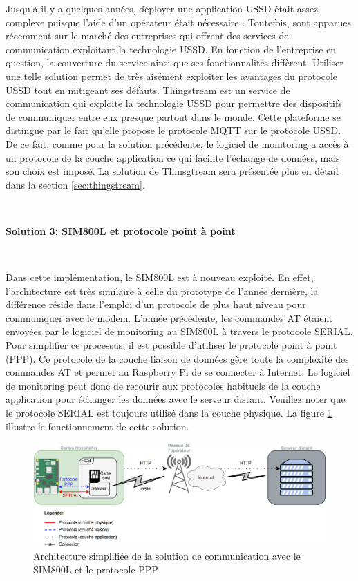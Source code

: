 \noindent
Jusqu'à il y a quelques années, déployer une application USSD était assez complexe puisque l'aide d'un opérateur était nécessaire \cite{perrier2015ussd}. Toutefois, sont apparues récemment sur le marché des entreprises qui offrent des services de communication exploitant la technologie USSD. En fonction de l'entreprise en question, la couverture du service ainsi que ses fonctionnalités diffèrent. Utiliser une telle solution permet de très aisément exploiter les avantages du protocole USSD tout en mitigeant ses défauts. Thingstream est un service de communication qui exploite la technologie USSD pour permettre des dispositifs de communiquer entre eux presque partout dans le monde. Cette plateforme se distingue par le fait qu'elle propose le protocole MQTT sur le protocole USSD. De ce fait, comme pour la solution précédente, le logiciel de monitoring a accès à un protocole de la couche application ce qui facilite l'échange de données, mais son choix est imposé. La solution de Thinsgtream sera présentée plus en détail dans la section \ref{sec:thingstream}.

~

\textbf{Solution 3: SIM800L et protocole point à point}

\vspace{-0.2cm}
~

\noindent
Dans cette implémentation, le SIM800L est à nouveau exploité. En effet, l'architecture est très similaire à celle du prototype de l'année dernière, la différence réside dans l'emploi d'un protocole de plus haut niveau pour communiquer avec le modem. L'année précédente, les commandes AT étaient envoyées par le logiciel de monitoring au SIM800L à travers le protocole SERIAL. Pour simplifier ce processus, il est possible d'utiliser le protocole point à point (PPP). Ce protocole de la couche liaison de données gère toute la complexité des commandes AT et permet au Raspberry Pi de se connecter à Internet. Le logiciel de monitoring peut donc de recourir aux protocoles habituels de la couche application pour échanger les données avec le serveur distant. Veuillez noter que le protocole SERIAL est toujours utilisé dans la couche physique. La figure \ref{fig:so2} illustre le fonctionnement de cette solution.


\begin{figure}[ht!]
  \includegraphics[width=\textwidth]{img/el_prototype/solution3_com.png}
  \caption{Architecture simplifiée de la solution de communication avec le SIM800L et le protocole PPP}
  \label{fig:so2}
\end{figure}

